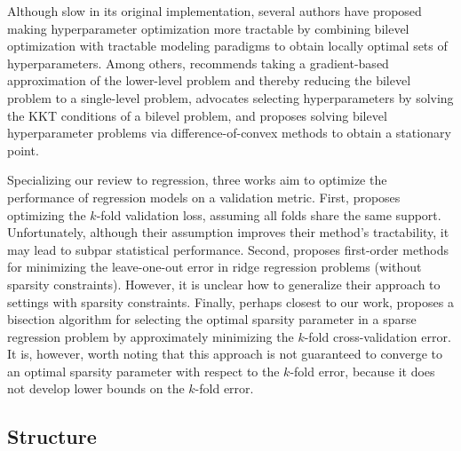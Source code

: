 \documentclass[ijoc,noblindrev]{informs3} %
\begin{document}
Although slow in its original implementation, several authors have proposed making hyperparameter optimization more tractable by combining bilevel optimization with tractable modeling paradigms to obtain locally optimal sets of hyperparameters. Among others, \cite{sinha2020gradient} recommends taking a gradient-based approximation of the lower-level problem and thereby reducing the bilevel problem to a single-level problem, \cite{okuno2021lp} advocates selecting hyperparameters by solving the KKT conditions of a bilevel problem, and \cite{ye2022difference} proposes solving bilevel hyperparameter problems via difference-of-convex methods to obtain a stationary point.%

Specializing our review to regression, three works aim to optimize the performance of regression models on a validation metric. First, \cite{takano2020best} proposes optimizing the $k$-fold validation loss, assuming all folds share the same support. Unfortunately, although their assumption improves their method's tractability, it may lead to subpar statistical performance. Second, \citet{stephenson2021can} proposes first-order methods for minimizing the leave-one-out error in ridge regression problems (without sparsity constraints). However, it is unclear how to generalize their approach to settings with sparsity constraints. Finally, perhaps closest to our work, \cite{kenney2021mip} proposes a bisection algorithm for selecting the optimal sparsity parameter in a sparse regression problem by approximately minimizing the $k$-fold cross-validation error. It is, however, worth noting that this approach is not guaranteed to converge to an optimal sparsity parameter with respect to the $k$-fold error, because it does not develop lower bounds on the $k$-fold error. 

\subsection{Structure}
\end{document}
